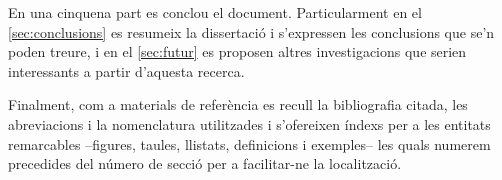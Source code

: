 En una cinquena part es conclou el document. Particularment en el
\autoref{sec:conclusions} es resumeix la dissertació i s'expressen les
conclusions que se'n poden treure, i en el \autoref{sec:futur} es
proposen altres investigacions que serien interessants a partir
d'aquesta recerca.




Finalment, com a materials de referència es recull la bibliografia
citada, les abreviacions i la nomenclatura utilitzades i s'ofereixen
índexs per a les entitats remarcables --figures, taules, llistats, definicions
i exemples-- les quals numerem precedides del número de secció per a
facilitar-ne la localització.





















